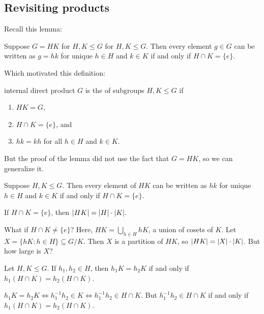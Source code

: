 \documentclass[12pt,letterpaper]{report}
\begin{document}
\pagebreak
\subsection{Revisiting products}

Recall this lemma:

\begin{lem}{}{}
  Suppose $G = HK$ for $H, K \leq G$ for $H, K \leq G$.
  Then every element $g \in G$ can be written as $g = hk$ for unique $h \in H$ and $k \in K$ if and
  only if $H \cap K = \{e\}$.
\end{lem}

Which motivated this definition:

\begin{defn}{internal direct product}{}
  $G$ is the  of subgroups $H, K \leq G$ if
  \begin{enumerate}
    \item $HK = G$,
    \item $H \cap K = \{e\}$, and
    \item $hk = kh$ for all $h \in H$ and $k \in K$.
  \end{enumerate}
\end{defn}

But the proof of the lemma did not use the fact that $G = HK$, so we can generalize it.

\begin{lem}{}{}
  Suppose $H, K \leq G$.
  Then every element of $HK$ can be written as $hk$ for unique $h \in H$ and $k \in K$ if and only
  if $H \cap K = \{e\}$.
\end{lem}

If $H \cap K = \{e\}$, then $\lvert HK\rvert = \lvert H\rvert \cdot \lvert K\rvert$.

What if $H \cap K \neq \{e\}$?
Here, $HK = \bigcup_{h \in H} hK$, a union of cosets of $K$.
Let $X = \{hK : h \in H\} \subseteq G/K$.
Then $X$ is a partition of $HK$, so $\lvert HK\rvert = \lvert X\rvert \cdot \lvert K\rvert$.
But how large is $X$?

\begin{lem}{}{}
  Let $H, K \leq G$.
  If $h_1, h_2 \in H$, then $h_1K = h_2K$ if and only if $h_1(H \cap K) = h_2(H \cap K)$.
\end{lem}

\begin{thmproof}
  $h_1K = h_2K \iff h_1^{-1}h_2 \in K \iff h_1^{-1}h_2 \in H \cap K$.
  But $h_1^{-1}h_2 \in H \cap K$ if and only if $h_1(H \cap K) = h_2(H \cap K)$.
\end{thmproof}
\end{document}
